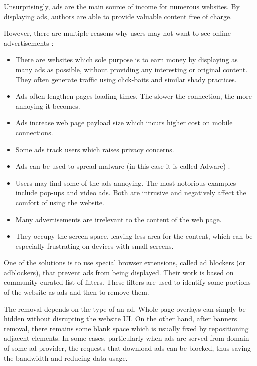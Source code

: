Unsurprisingly, ads are the main source of income for numerous websites. By displaying ads, authors are able to provide
valuable content free of charge. 

However, there are multiple reasons why users may not want to see online advertisements \cite{pagefair:adblock-report, globalwebindex:report}: 
\begin{itemize}
  \item There are websites which sole purpose is to earn money by displaying as many ads 
           as possible, without providing any interesting or original content.
           They often generate traffic using click-baits and similar shady practices.
  \item Ads often lengthen pages loading times. The slower the connection, the more annoying it becomes.
  \item Ads increase web page payload size which incurs higher cost on mobile connections.
  \item Some ads track users which raises privacy concerns.
  \item Ads can be used to spread malware (in this case it is called Adware) \cite{adblock:adware}.
  \item Users may find some of the ads annoying. The most notorious examples include pop-ups and video ads.
        Both are intrusive and negatively affect the comfort of using the website.
  \item Many advertisements are irrelevant to the content of the web page.
  \item They occupy the screen space, leaving less area for the content,
           which can be especially frustrating on devices with small screens.
\end{itemize}

One of the solutions is to use special browser extensions, called ad blockers (or adblockers), 
that prevent ads from being displayed.
Their work is based on community-curated list of filters. These filters are used to identify some portions
of the website as ads and then to remove them.

The removal depends on the type of an ad. Whole page overlays can simply be hidden without disrupting
the website UI. On the other hand, after banners removal, there remains some blank space which is usually
fixed by repositioning adjacent elements. In some cases, particularly when ads are served from domain
of some ad provider, the requests that download ads can be blocked, thus saving the bandwidth and reducing data usage.

